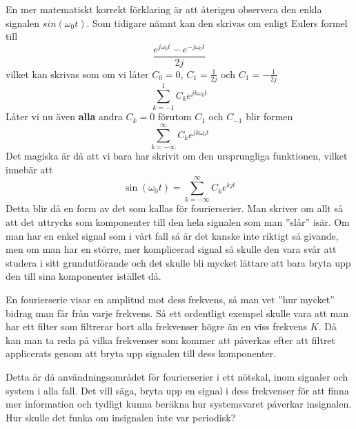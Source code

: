\documentclass{article}
\begin{document}
En mer matematiskt korrekt förklaring är att återigen observera den enkla signalen $sin(\omega_0 t)$. Som tidigare nämnt kan den skrivas om enligt Eulers formel till
\[ \frac{e^{j \omega_0 t} - e^{-j \omega_0 t}}{2j}\]
vilket kan skrivas som om vi låter $C_0=0$, $C_{1}=\frac{1}{2j}$ och $C_{1}=-\frac{1}{2j}$
\[ \sum_{k=-1}^1 C_k e^{j k \omega_0 t} \]
Låter vi nu även \textbf{alla} andra $C_k = 0$ förutom  $C_1$ och $C_{-1}$ blir formen
\[ \sum_{k=-\infty}^{\infty} C_k e^{j k \omega_0 t} \]
Det magiska är då att vi bara har skrivit om den ursprungliga funktionen, vilket innebär att 
\[ \sin(\omega_0 t) = \sum_{k=-\infty}^{\infty} C_k e^{k j t} \]
Detta blir då en form av det som kallas för fourierserier. Man skriver om allt så att det uttrycks som komponenter till den hela signalen som man ''slår'' isär. Om man har en enkel signal som i vårt fall så är det kanske inte riktigt så givande, men om man har en större, mer komplicerad signal så skulle den vara svår att studera i sitt grundutförande och det skulle bli mycket lättare att bara bryta upp den till sina komponenter istället då.

En fourierserie visar en amplitud mot dess frekvens, så man vet ''hur mycket'' bidrag man får från varje frekvens. Så ett ordentligt exempel skulle vara att man har ett filter som filtrerar bort alla frekvenser högre än en viss frekvens $K$. %
Då kan man ta reda på vilka frekvenser som kommer att påverkas efter att filtret applicerats genom att bryta upp signalen till dess komponenter. 

Detta är då användningsområdet för fourierserier i ett nötskal, inom signaler och system i alla fall. Det vill säga, bryta upp en signal i dess frekvenser för att finna mer information och tydligt kunna beräkna hur systemsvaret påverkar insignalen. Hur skulle det funka om insignalen inte var periodisk? 
\end{document}
